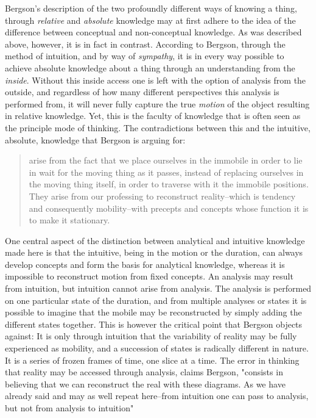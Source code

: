 \documentclass[11pt]{article}
\begin{document}
Bergson's description of the two profoundly different ways of knowing a thing, through \emph{relative} and \emph{absolute} knowledge may at first adhere to the idea of the difference between conceptual and non-conceptual knowledge. As was described above, however, it is in fact in contrast. According to Bergson, through the method of intuition, and by way of \emph{sympathy}, it is in every way possible to achieve absolute knowledge about a thing through an understanding from the \emph{inside}. Without this inside access one is left with the option of analysis from the outside, and regardless of how many different perspectives this analysis is performed from, it will never fully capture the true \emph{motion} of the object resulting in relative knowledge. Yet, this is the faculty of knowledge that is often seen as the principle mode of thinking. The contradictions between this and the intuitive, absolute, knowledge that Bergson is arguing for:

\begin{quote}
arise from the fact that we place ourselves in the immobile in order to lie in wait for the moving thing as it passes, instead of replacing ourselves in the moving thing itself, in order to traverse with it the immobile positions. They arise from our professing to reconstruct reality--which is tendency and consequently mobility--with precepts and concepts whose function it is to make it stationary. \citep[p. 67]{Bergson1912}
\end{quote}

One central aspect of the distinction between analytical and intuitive knowledge made here is that the intuitive, being in the motion or the duration, can always develop concepts and form the basis for analytical knowledge, whereas it is impossible to reconstruct motion from fixed concepts. An analysis may result from intuition, but intuition cannot arise from analysis. The analysis is performed on one particular state of the duration, and from multiple analyses or states it is possible to imagine that the mobile may be reconstructed by simply adding the different states together. This is however the critical point that Bergson objects against: It is only through intuition that the variability of reality may be fully experienced as mobility, and a succession of states is radically different in nature. It is a series of frozen frames of time, one slice at a time. The error in thinking that reality may be accessed through analysis, claims Bergson, "consists in believing that we can reconstruct the real with these diagrams. As we have already said and may as well repeat here--from intuition one can pass to analysis, but not from analysis to intuition" \citep[p. 48]{Bergson1912}
\end{document}
